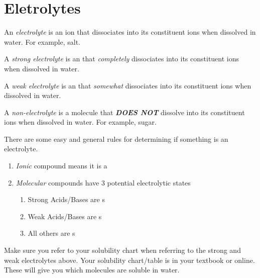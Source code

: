 \section{Eletrolytes} \label{sec:Eletrolytes}
\begin{definition}[Eletrolyte] \label{def:Electrolyte}
  An \emph{electrolyte} is an ion that dissociates into its constituent ions when dissolved in water.
  For example, salt.
\end{definition}
\begin{definition} \label{def:Strong Electrolyte}
  A \emph{strong electrolyte} is an  that \emph{completely} dissociates into its constituent ions when dissolved in water.
\end{definition}
\begin{definition} \label{def:Weak Electrolyte}
  A \emph{weak electrolyte} is an  that \emph{somewhat} dissociates into its constituent ions when dissolved in water.
\end{definition}
\begin{definition} \label{def:Non-Electrolyte}
  A \emph{non-electrolyte} is a molecule that \textbf{\emph{DOES NOT}} dissolve into its constituent ions when dissolved in water.
  For example, sugar.
\end{definition}

There are some easy and general rules for determining if something is an electrolyte.
\begin{enumerate}
\item \emph{Ionic} compound means it is a 
\item \emph{Molecular} compounds have 3 potential electrolytic states
  \begin{enumerate}
  \item Strong Acids/Bases are s
  \item Weak Acids/Bases are s
  \item All others are s
  \end{enumerate}
\end{enumerate}

Make sure you refer to your solubility chart when referring to the strong and weak electrolytes above.
Your solubility chart/table is in your textbook or online.
These will give you which molecules are soluble in water.

